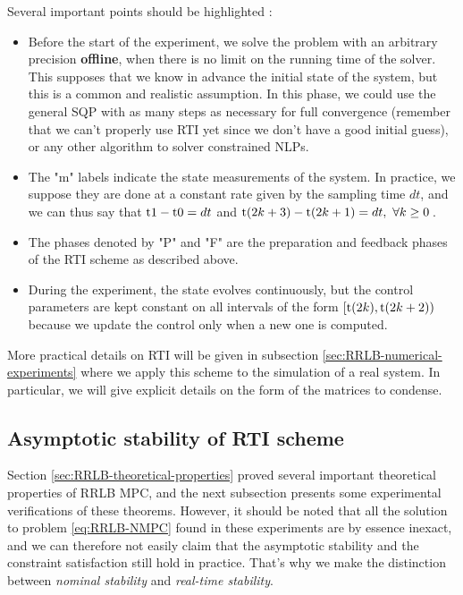 \documentclass[12pt]{article}
\begin{document}
\noindent Several important points should be highlighted :

\begin{itemize}[label=\textbullet]
	\item Before the start of the experiment, we solve the problem with an arbitrary precision \textbf{offline}, when there is no limit on the running time of the solver.
	This supposes that we know in advance the initial state of the system, but this is a common and realistic assumption.
	In this phase, we could use the general SQP with as many steps as necessary for full convergence (remember that we can't properly use RTI yet since we don't have a good initial guess), or any other algorithm to solver constrained NLPs.

	\item The "\color{green}m\color{black}" labels indicate the state measurements of the system.
	In practice, we suppose they are done at a constant rate given by the sampling time $dt$, and we can thus say that $\rm{t}1-\rm{t}0=dt$ and $\rm{t}(2k+3)-\rm{t}(2k+1)=dt,~\forall k\geq 0$\,.

	\item The phases denoted by "\color{red}P\color{black}" and "\color{blue}F\color{black}" are the preparation and feedback phases of the RTI scheme as described above.

	\item During the experiment, the state evolves continuously, but the control parameters are kept constant on all intervals of the form $[\rm{t}(2k),\rm{t}(2k+2))$ because we update the control only when a new one is computed.
\end{itemize}

More practical details on RTI will be given in subsection \ref{sec:RRLB-numerical-experiments} where we apply this scheme to the simulation of a real system.
In particular, we will give explicit details on the form of the matrices to condense.

\subsection{Asymptotic stability of RTI scheme}\label{sec:RRLB-real-time-stability}

Section \ref{sec:RRLB-theoretical-properties} proved several important theoretical properties of RRLB MPC, and the next subsection presents some experimental verifications of these theorems.
However, it should be noted that all the solution to problem \ref{eq:RRLB-NMPC} found in these experiments are by essence inexact, and we can therefore not easily claim that the asymptotic stability and the constraint satisfaction still hold in practice. That's why we make the distinction between \textit{nominal stability} and \textit{real-time stability}.
\end{document}
